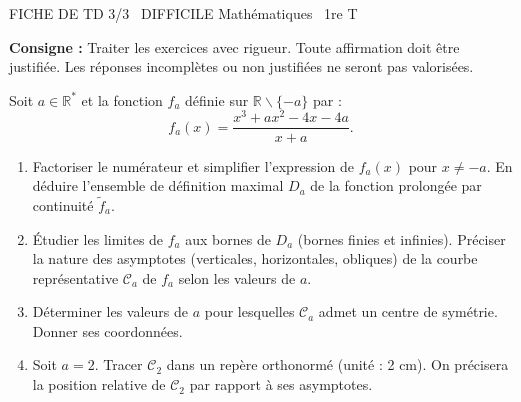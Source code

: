 \documentclass[11pt]{article}
\def\setminus{\mathbin{\backslash}}\let\smallsetminus\setminus
\begin{document}
\begin{tcolorbox}[enhanced,colback=popink,colframe=popink,arc=10pt,boxrule=0pt,left=12pt,right=12pt,top=9pt,bottom=9pt]
{\color{white}\popxbold\small FICHE DE TD 3/3 \textbullet\ DIFFICILE \hfill Mathématiques \textbullet\ 1re T\par}
\end{tcolorbox}
\vspace{4pt}
\noindent \textbf{Consigne :} Traiter les exercices avec rigueur. Toute affirmation doit être justifiée. Les réponses incomplètes ou non justifiées ne seront pas valorisées.

\begin{exercice}
Soit $a \in \mathbb{R}^*$ et la fonction $f_a$ définie sur $\mathbb{R}\setminus\{-a\}$ par :
$$ f_a(x) = \frac{x^3 + a x^2 - 4x - 4a}{x + a}. $$
\begin{enumerate}
    \item Factoriser le numérateur et simplifier l'expression de $f_a(x)$ pour $x \neq -a$. En déduire l'ensemble de définition maximal $D_a$ de la fonction prolongée par continuité $\tilde{f}_a$.
    \item Étudier les limites de $f_a$ aux bornes de $D_a$ (bornes finies et infinies). Préciser la nature des asymptotes (verticales, horizontales, obliques) de la courbe représentative $\mathcal{C}_a$ de $f_a$ selon les valeurs de $a$.
    \item Déterminer les valeurs de $a$ pour lesquelles $\mathcal{C}_a$ admet un centre de symétrie. Donner ses coordonnées.
    \item Soit $a=2$. Tracer $\mathcal{C}_2$ dans un repère orthonormé (unité : 2 cm). On précisera la position relative de $\mathcal{C}_2$ par rapport à ses asymptotes.
\end{enumerate}
\end{exercice}
\end{document}
